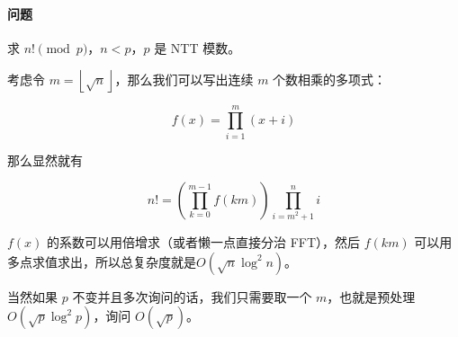 \paragraph{问题} 求 $n! \pmod p$，$n < p$，$p$ 是 NTT 模数。

考虑令 $m = \left\lfloor \sqrt n \right\rfloor$，那么我们可以写出连续 $m$ 个数相乘的多项式：

$$ f(x) = \prod_{i = 1} ^ m (x + i) $$

那么显然就有

$$ n! = \left( \prod_{k = 0} ^ {m - 1} f(k m) \right) \prod_{i = m ^ 2 + 1} ^ n i $$

$f(x)$ 的系数可以用倍增求（或者懒一点直接分治 FFT），然后 $f(km)$ 可以用多点求值求出，所以总复杂度就是$O(\sqrt n \log^2 n)$。

当然如果 $p$ 不变并且多次询问的话，我们只需要取一个 $m$，也就是预处理 $O(\sqrt p \log^2 p)$，询问 $O(\sqrt p)$。
